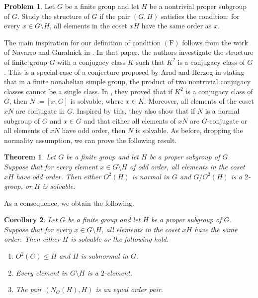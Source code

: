 \documentclass[twoside,a4paper,reqno,11pt]{amsart}
\newcommand{\<}{\langle}
\renewcommand{\>}{\rangle}
\newcommand{\leqs}{\leqslant}
\newcommand{\F}{\mathrm{(F)}}
\renewcommand{\leq}{\leqs}
\renewcommand{\:}{\colon}
\newtheorem{theorem}{Theorem}
\newtheorem{corol}[theorem]{Corollary}
\theoremstyle{definition}
\newtheorem{problem}{Problem}
\begin{document}
\begin{problem}\label{prob1}
Let $G$ be a finite group and let $H$ be a nontrivial proper subgroup of $G$. Study the structure of $G$ if the pair $(G,H)$ satisfies the condition: for every $x\in G\setminus H$, all elements in the coset $xH$ have the same order as $x$. 
\end{problem}



\medskip

The  main inspiration  for our definition  of condition $\F$ follows from the work of Navarro and Guralnick in \cite{GN}.  In that paper, the authors investigate the structure of finite group $G$ with a conjugacy class $K$ such that $K^2$ is a conjugacy class of $G$. This is a special case of a conjecture proposed by Arad and Herzog in  \cite{Arad-Herzog} stating that in a finite nonabelian simple group, the product of two nontrivial conjugacy classes cannot be a single class. In \cite{GN}, they proved that if $K^2$ is a conjugacy class of $G$, then $N:=[x,G]$ is solvable, where $x\in K$. Moreover, all elements of the coset $xN$ are conjugate in $G$. Inspired by this, they also show that  if $N$ is a normal subgroup of $G$ and $x\in G$ and that either all elements of $xN$ are $G$-conjugate or all elements of $xN$ have odd order, then $N$ is solvable.  As before, dropping the normality assumption, we can prove the following result.


\begin{theorem}\label{th:odd-order-coset}
Let $G$ be a finite group and let $H$ be a proper subgroup of $G$. Suppose that for every element $x\in G\setminus H$ of odd order, all elements in the coset $xH$ have odd order. Then either $O^2(H)$ is normal in $G$ and $G/O^2(H)$ is a $2$-group, or $H$ is solvable.
\end{theorem}
As a consequence, we obtain the following.

\begin{corol}\label{cor1} Let $G$ be a finite group and let $H$ be a proper subgroup of $G$.  Suppose that for every $x\in G\setminus H$, all elements in the coset $xH$ have the same order.  Then  either $H$ is solvable or the following hold.
\begin{enumerate}[$(a)$]
\item $O^2(G)\leq H$ and $H$ is subnormal in $G$.
\item Every element in $G\setminus H$ is a $2$-element.
\item The pair $(N_G(H),H)$ is an equal order pair.
 \end{enumerate}
\end{corol}
\end{document}
